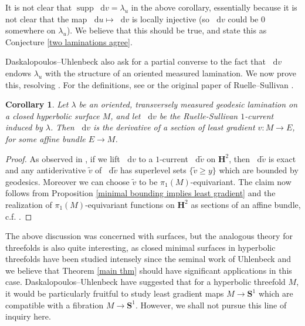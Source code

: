 \documentclass[reqno,12pt,letterpaper]{amsart}
\newcommand{\Hyp}{\mathbf H}
\newcommand{\Sph}{\mathbf S}
\DeclareMathOperator{\supp}{supp}
\newcommand*\dif{\mathop{}\!\mathrm{d}}
\newtheorem{corollary}[theorem]{Corollary}
\theoremstyle{definition}
\numberwithin{equation}{section}
\begin{document}
It is not clear that $\supp \dif v = \lambda_u$ in the above corollary, essentially because it is not clear that the map $\dif u \mapsto \dif v$ is locally injective (so $\dif v$ could be $0$ somewhere on $\lambda_u$).
We believe that this should be true, and state this as Conjecture \ref{two laminations agree}.

Daskalopoulos--Uhlenbeck also ask for a partial converse to the fact that $\dif v$ endows $\lambda_u$ with the structure of an oriented measured lamination.
We now prove this, resolving \cite[Problem 9.7]{daskalopoulos2020transverse}.
For the definitions, see \cite[\S8]{daskalopoulos2020transverse} or the original paper of Ruelle--Sullivan \cite{Ruelle75}.

\begin{corollary}\label{ruelle sullivan antiderivative}
Let $\lambda$ be an oriented, transversely measured geodesic lamination on a closed hyperbolic surface $M$, and let $\dif v$ be the Ruelle-Sullivan $1$-current induced by $\lambda$.
Then $\dif v$ is the derivative of a section of least gradient $v: M \to E$, for some affine bundle $E \to M$.
\end{corollary}
\begin{proof}
As observed in \cite[\S9]{daskalopoulos2020transverse}, if we lift $\dif v$ to a $1$-current $\dif \tilde v$ on $\Hyp^2$, then $\dif \tilde v$ is exact and any antiderivative $\tilde v$ of $\dif \tilde v$ has superlevel sets $\{\tilde v \geq y\}$ which are bounded by geodesics.
Moreover we can choose $\tilde v$ to be $\pi_1(M)$-equivariant.
The claim now follows from Proposition \ref{minimal bounding implies least gradient} and the realization of $\pi_1(M)$-equivariant functions on $\Hyp^2$ as sections of an affine bundle, c.f. \cite[\S4]{daskalopoulos2020transverse}.
\end{proof}

The above discussion was concerned with surfaces, but the analogous theory for threefolds is also quite interesting, as closed minimal surfaces in hyperbolic threefolds have been studied intensely since the seminal work of Uhlenbeck \cite{Uhlenbeck1983ClosedMS} and we believe that Theorem \ref{main thm} should have significant applications in this case.
Daskalopoulos--Uhlenbeck have suggested \cite[Problem 9.13]{daskalopoulos2020transverse} that for a hyperbolic threefold $M$, it would be particularly fruitful to study least gradient maps $M \to \Sph^1$ which are compatible with a fibration $M \to \Sph^1$.
However, we shall not pursue this line of inquiry here.
\end{document}
